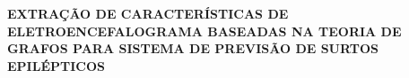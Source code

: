 \begin{center}

\begin{table}[!h]
\centering
{}


\end{table}




\textbf{EXTRAÇÃO DE CARACTERÍSTICAS DE ELETROENCEFALOGRAMA BASEADAS NA TEORIA DE GRAFOS PARA SISTEMA DE PREVISÃO DE SURTOS EPILÉPTICOS}\vspace{0.5cm}


\end{center}
